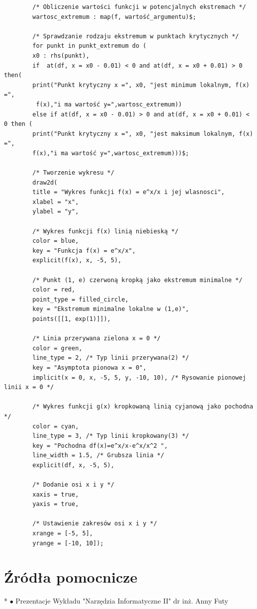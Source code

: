 \documentclass[]{article}
\begin{document}
\begin{verbatim}
		/* Obliczenie wartości funkcji w potencjalnych ekstremach */
		wartosc_extremum : map(f, wartość_argumentu)$;
		
		/* Sprawdzanie rodzaju ekstremum w punktach krytycznych */
		for punkt in punkt_extremum do (
		x0 : rhs(punkt),
		if  at(df, x = x0 - 0.01) < 0 and at(df, x = x0 + 0.01) > 0 then(
		print("Punkt krytyczny x =", x0, "jest minimum lokalnym, f(x) =",
		 f(x),"i ma wartość y=",wartosc_extremum))
		else if at(df, x = x0 - 0.01) > 0 and at(df, x = x0 + 0.01) < 0 then (
		print("Punkt krytyczny x =", x0, "jest maksimum lokalnym, f(x) =", 
		f(x),"i ma wartość y=",wartosc_extremum)))$;
		
		/* Tworzenie wykresu */
		draw2d(
		title = "Wykres funkcji f(x) = e^x/x i jej wlasnosci",
		xlabel = "x",
		ylabel = "y",
		
		/* Wykres funkcji f(x) linią niebieską */
		color = blue,
		key = "Funkcja f(x) = e^x/x",
		explicit(f(x), x, -5, 5),
		
		/* Punkt (1, e) czerwoną kropką jako ekstremum minimalne */
		color = red,
		point_type = filled_circle,
		key = "Ekstremum minimalne lokalne w (1,e)",
		points([[1, exp(1)]]),
		
		/* Linia przerywana zielona x = 0 */
		color = green,
		line_type = 2, /* Typ linii przerywana(2) */
		key = "Asymptota pionowa x = 0",
		implicit(x = 0, x, -5, 5, y, -10, 10), /* Rysowanie pionowej linii x = 0 */
		
		/* Wykres funkcji g(x) kropkowaną linią cyjanową jako pochodna */
		color = cyan,
		line_type = 3, /* Typ linii kropkowany(3) */
		key = "Pochodna df(x)=e^x/x-e^x/x^2 ",
		line_width = 1.5, /* Grubsza linia */
		explicit(df, x, -5, 5),
		
		/* Dodanie osi x i y */
		xaxis = true,
		yaxis = true,
		
		/* Ustawienie zakresów osi x i y */
		xrange = [-5, 5],
		yrange = [-10, 10]);
	\end{verbatim}

\section*{Źródła pomocnicze}
\begin{thebibliography}*{}
$\bullet$  Prezentacje Wykładu "Narzędzia Informatyczne II" dr inż. Anny Futy
	
	
\end{thebibliography}
\end{document}
